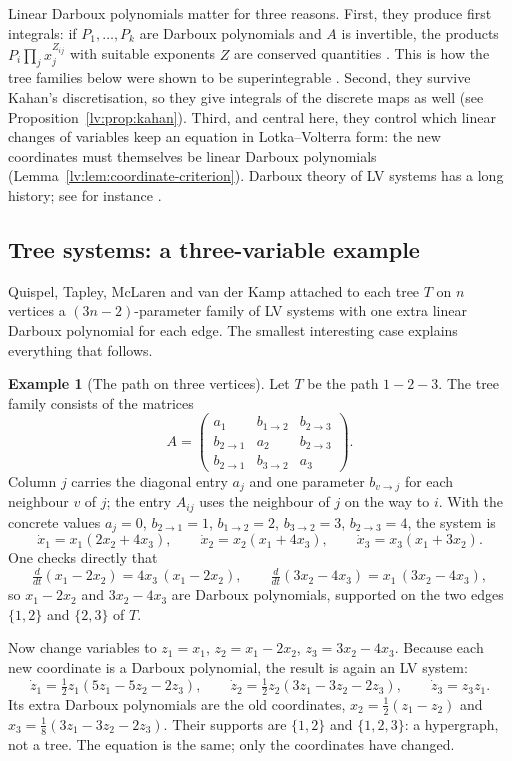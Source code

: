 \documentclass[11pt,a4paper]{article}
\theoremstyle{definition}
\newtheorem{example}[theorem]{Example}
\theoremstyle{remark}
\begin{document}
Linear Darboux polynomials matter for three reasons. First, they produce first integrals: if $P_1,\dots,P_k$ are Darboux polynomials and $A$ is invertible, the products $P_i\prod_j x_j^{Z_{ij}}$ with suitable exponents $Z$ are conserved quantities \cite[\S2, eq.~(3)]{lv:K2025}. This is how the tree families below were shown to be superintegrable \cite{lv:QTMK2023,lv:KQM2024}. Second, they survive Kahan's discretisation, so they give integrals of the discrete maps as well \cite{lv:CEMOQTK2019,lv:QTMK2023b} (see Proposition~\ref{lv:prop:kahan}). Third, and central here, they control which linear changes of variables keep an equation in Lotka--Volterra form: the new coordinates must themselves be linear Darboux polynomials (Lemma~\ref{lv:lem:coordinate-criterion}). Darboux theory of LV systems has a long history; see for instance \cite{lv:CL2000,lv:MO2001,lv:Bog2008,lv:CD2009}.

\subsection{Tree systems: a three-variable example}

Quispel, Tapley, McLaren and van der Kamp \cite{lv:QTMK2023,lv:KQM2024} attached to each tree $T$ on $n$ vertices a $(3n-2)$-parameter family of LV systems with one extra linear Darboux polynomial for each edge. The smallest interesting case explains everything that follows.

\begin{example}[The path on three vertices]
\label{lv:ex:P3}
Let $T$ be the path $1-2-3$. The tree family consists of the matrices
\[
 A=\begin{pmatrix}
 a_1 & b_{1\to2} & b_{2\to3}\\
 b_{2\to1} & a_2 & b_{2\to3}\\
 b_{2\to1} & b_{3\to2} & a_3
 \end{pmatrix}.
\]
Column $j$ carries the diagonal entry $a_j$ and one parameter $b_{v\to j}$ for each neighbour $v$ of $j$; the entry $A_{ij}$ uses the neighbour of $j$ on the way to $i$. With the concrete values $a_j=0$, $b_{2\to1}=1$, $b_{1\to2}=2$, $b_{3\to2}=3$, $b_{2\to3}=4$, the system is
\[
 \dot x_1=x_1(2x_2+4x_3),\qquad
 \dot x_2=x_2(x_1+4x_3),\qquad
 \dot x_3=x_3(x_1+3x_2).
\]
One checks directly that
\[
 \tfrac{d}{dt}(x_1-2x_2)=4x_3\,(x_1-2x_2),\qquad
 \tfrac{d}{dt}(3x_2-4x_3)=x_1\,(3x_2-4x_3),
\]
so $x_1-2x_2$ and $3x_2-4x_3$ are Darboux polynomials, supported on the two edges $\{1,2\}$ and $\{2,3\}$ of $T$.

Now change variables to $z_1=x_1$, $z_2=x_1-2x_2$, $z_3=3x_2-4x_3$. Because each new coordinate is a Darboux polynomial, the result is again an LV system:
\[
 \dot z_1=\tfrac12 z_1(5z_1-5z_2-2z_3),\qquad
 \dot z_2=\tfrac12 z_2(3z_1-3z_2-2z_3),\qquad
 \dot z_3=z_3z_1.
\]
Its extra Darboux polynomials are the old coordinates, $x_2=\tfrac12(z_1-z_2)$ and $x_3=\tfrac18(3z_1-3z_2-2z_3)$. Their supports are $\{1,2\}$ and $\{1,2,3\}$: a hypergraph, not a tree. The equation is the same; only the coordinates have changed.
\end{example}
\end{document}
